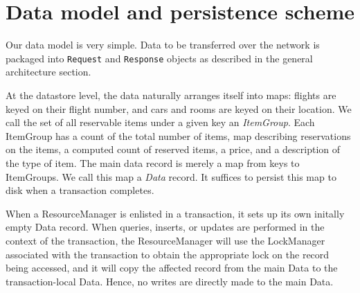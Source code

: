 \documentclass[letterpaper,11pt]{article}
\begin{document}
\section{Data model and persistence scheme}

Our data model is very simple. Data to be transferred over the network is
packaged into \texttt{Request} and \texttt{Response} objects as described in
the general architecture section.

At the datastore level, the data naturally arranges itself into maps: flights
are keyed on their flight number, and cars and rooms are keyed on their
location. We call the set of all reservable items under a given key an
\emph{ItemGroup}. Each ItemGroup has a count of the total number of items, map
describing reservations on the items, a computed count of reserved items, a
price, and a description of the type of item. The main data record is merely a
map from keys to ItemGroups. We call this map a \emph{Data} record. It suffices
to persist this map to disk when a transaction completes.

When a ResourceManager is enlisted in a transaction, it sets up its own
initally empty Data record. When queries, inserts, or updates are performed in
the context of the transaction, the ResourceManager will use the LockManager
associated with the transaction to obtain the appropriate lock on the record
being accessed, and it will copy the affected record from the main Data to the
transaction-local Data. Hence, no writes are directly made to the main Data.
\end{document}
